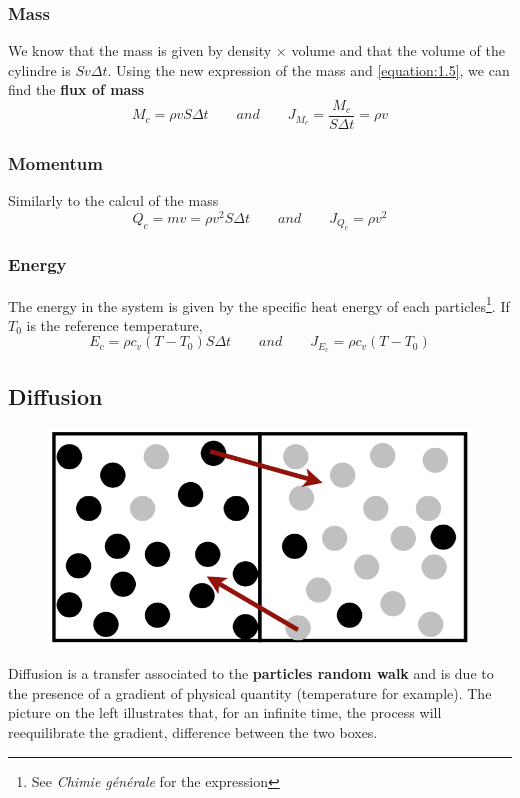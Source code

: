 \subsubsection{Mass}
	We know that the mass is given by density $\times$ volume and that the volume of the cylindre is $Sv\Delta t$. Using the new expression of the mass and \eqref{equation:1.5}, we can find the \textbf{flux of mass} 
	\begin{equation}
		M_c = \rho v S \Delta t \qquad and \qquad  J_{M_c} = \frac{M_c}{S\Delta t} = \rho v
	\end{equation}
	
\subsubsection{Momentum}
	Similarly to the calcul of the mass
	\begin{equation}
		Q_c = mv = \rho v^2 S \Delta t \qquad and \qquad J_{Q_c} = \rho v^2
	\end{equation}
	
\subsubsection{Energy}
	The energy in the system is given by the specific heat energy of each particles\footnote{See \emph{Chimie générale} for the expression}. If $T_0$ is the reference temperature, 
	\begin{equation}
		E_c = \rho c_v (T-T_0) S \Delta t \qquad and \qquad J_{E_c} = \rho c_v (T-T_0)
	\end{equation}
	
\subsection{Diffusion}
	\begin{figure}
	\vspace{-5mm}
	\includegraphics[scale=0.26]{ch1/3}
	\end{figure}
	Diffusion is a transfer associated to the \textbf{particles	random walk} and is due to the presence of a gradient of physical quantity (temperature for example). The picture on the left illustrates that, for an infinite time, the process will reequilibrate the gradient, difference between the two boxes.
	
